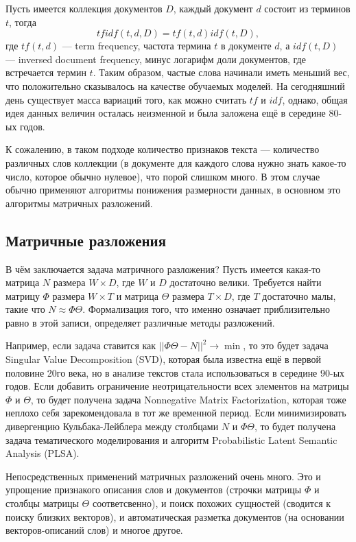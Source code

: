 \documentclass[a4paper,14pt]{extarticle}
\begin{document}
Пусть имеется коллекция документов $D$, каждый документ $d$ состоит из терминов $t$, тогда 
\[
tfidf(t, d, D) = tf(t, d) idf(t, D),
\]
где $tf(t, d)$ --- term frequency, частота термина $t$ в документе $d$, а $idf(t, D)$ --- inversed document frequency, минус логарифм доли документов, где встречается термин $t$. Таким образом, частые слова начинали иметь меньший вес, что положительно сказывалось на качестве обучаемых моделей. На сегодняшний день существует масса вариаций того, как можно считать $tf$ и $idf$, однако, общая идея данных величин осталась неизменной и была заложена ещё в середине 80-ых годов.

К сожалению, в таком подходе количество признаков текста --- количество различных слов коллекции (в документе для каждого слова нужно знать какое-то число, которое обычно нулевое), что порой слишком много. В этом случае обычно применяют алгоритмы понижения размерности данных, в основном это алгоритмы матричных разложений.
\subsection{Матричные разложения}
В чём заключается задача матричного разложения? Пусть имеется какая-то матрица $N$ размера $W \times D$, где $W$ и $D$ достаточно велики. Требуется найти матрицу $\Phi$ размера $W \times T$ и матрица $\Theta$ размера $T \times D$, где $T$ достаточно малы, такие что $N \approx \Phi \Theta$. Формализация того, что именно означает приблизительно равно в этой записи, определяет различные методы разложений.

Например, если задача ставится как $||\Phi \Theta - N||^2 \to \min$, то это будет задача Singular Value Decomposition (SVD), которая была известна ещё в первой половине 20го века, но в анализе текстов стала использоваться в середине 90-ых годов. Если добавить ограничение неотрицательности всех элементов на матрицы $\Phi$ и $\Theta$, то будет получена задача Nonnegative Matrix Factorization, которая тоже неплохо себя зарекомендовала в тот же временной период. Если минимизировать дивергенцию Кульбака-Лейблера между столбцами $N$ и $\Phi\Theta$, то будет получена задача тематического моделирования и алгоритм Probabilistic Latent Semantic Analysis (PLSA).

Непосредственных применений матричных разложений очень много. Это и упрощение признакого описания слов и документов (строчки матрицы $\Phi$ и столбцы матрицы $\Theta$ соответсвенно), и поиск похожих сущностей (сводится к поиску близких векторов), и автоматическая разметка документов (на основании векторов-описаний слов) и многое другое.
\end{document}
